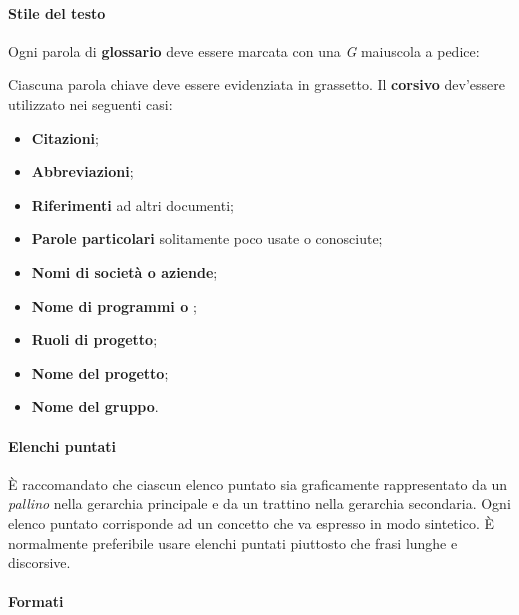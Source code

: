 	\paragraph{Stile del testo}
	
	Ogni parola di \textbf{glossario} deve essere marcata con una \textit{G} maiuscola a pedice:
	\begin{center}
	\end{center}

	Ciascuna parola chiave deve essere evidenziata in grassetto. Il \textbf{corsivo} dev'essere utilizzato nei seguenti casi:
	\begin{itemize}
	
		\item \textbf{Citazioni};
		\item \textbf{Abbreviazioni};
		\item \textbf{Riferimenti} ad altri documenti;
		\item \textbf{Parole particolari} solitamente poco usate o conosciute;
		\item \textbf{Nomi di società o aziende};
		\item \textbf{Nome di programmi o };
		\item \textbf{Ruoli di progetto};
		\item \textbf{Nome del progetto};
		\item \textbf{Nome del gruppo}.
	\end{itemize}		
	
	\paragraph{Elenchi puntati}
	
	È raccomandato che ciascun elenco puntato sia graficamente rappresentato da un \textit{pallino} nella gerarchia principale e da un trattino nella gerarchia secondaria. Ogni elenco puntato corrisponde ad un concetto che va espresso in modo sintetico. È normalmente preferibile usare elenchi puntati piuttosto che frasi lunghe e discorsive.
	
	\paragraph{Formati}
	
